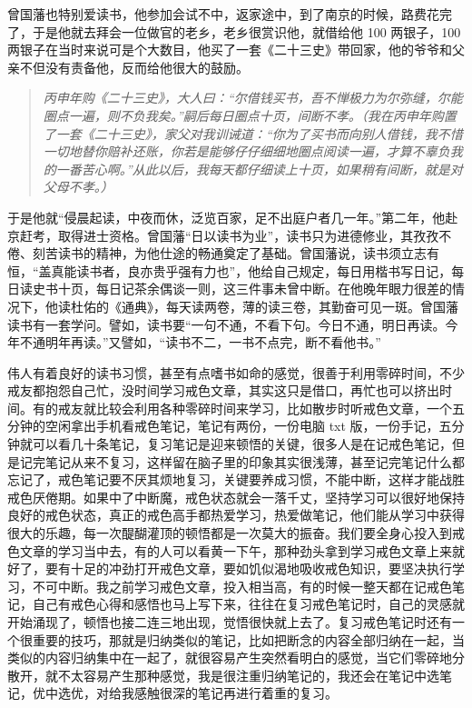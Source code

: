 曾国藩也特别爱读书，他参加会试不中，返家途中，到了南京的时候，路费花完了，于是他就去拜会一位做官的老乡，老乡很赏识他，就借给他 100 两银子，100 两银子在当时来说可是个大数目，他买了一套《二十三史》带回家，他的爷爷和父亲不但没有责备他，反而给他很大的鼓励。

\begin{quote}\it
    丙申年购《二十三史》，大人曰：“尔借钱买书，吾不惮极力为尔弥缝，尔能圈点一遍，则不负我矣。”嗣后每日圈点十页，间断不孝。（我在丙申年购置了一套《二十三史》，家父对我训诫道：“你为了买书而向别人借钱，我不惜一切地替你赔补还账，你若是能够仔仔细细地圈点阅读一遍，才算不辜负我的一番苦心啊。”从此以后，我每天都仔细读上十页，如果稍有间断，就是对父母不孝。）
\end{quote}

于是他就“侵晨起读，中夜而休，泛览百家，足不出庭户者几一年。”第二年，他赴京赶考，取得进士资格。曾国藩“日以读书为业”，读书只为进德修业，其孜孜不倦、刻苦读书的精神，为他仕途的畅通奠定了基础。曾国藩说，读书须立志有恒，“盖真能读书者，良亦贵乎强有力也”，他给自己规定，每日用楷书写日记，每日读史书十页，每日记茶余偶谈一则，这三件事未曾中断。在他晚年眼力很差的情况下，他读杜佑的《通典》，每天读两卷，薄的读三卷，其勤奋可见一斑。曾国藩读书有一套学问。譬如，读书要“一句不通，不看下句。今日不通，明日再读。今年不通明年再读。”又譬如，“读书不二，一书不点完，断不看他书。”

伟人有着良好的读书习惯，甚至有点嗜书如命的感觉，很善于利用零碎时间，不少戒友都抱怨自己忙，没时间学习戒色文章，其实这只是借口，再忙也可以挤出时间。有的戒友就比较会利用各种零碎时间来学习，比如散步时听戒色文章，一个五分钟的空闲拿出手机看戒色笔记，笔记有两份，一份电脑 txt 版，一份手记，五分钟就可以看几十条笔记，复习笔记是迎来顿悟的关键，很多人是在记戒色笔记，但是记完笔记从来不复习，这样留在脑子里的印象其实很浅薄，甚至记完笔记什么都忘记了，戒色笔记要不厌其烦地复习，关键要养成习惯，不能中断，这样才能战胜戒色厌倦期。如果中了中断魔，戒色状态就会一落千丈，坚持学习可以很好地保持良好的戒色状态，真正的戒色高手都热爱学习，热爱做笔记，他们能从学习中获得很大的乐趣，每一次醍醐灌顶的顿悟都是一次莫大的振奋。我们要全身心投入到戒色文章的学习当中去，有的人可以看黄一下午，那种劲头拿到学习戒色文章上来就好了，要有十足的冲劲打开戒色文章，要如饥似渴地吸收戒色知识，要坚决执行学习，不可中断。我之前学习戒色文章，投入相当高，有的时候一整天都在记戒色笔记，自己有戒色心得和感悟也马上写下来，往往在复习戒色笔记时，自己的灵感就开始涌现了，顿悟也接二连三地出现，觉悟很快就上去了。复习戒色笔记时还有一个很重要的技巧，那就是归纳类似的笔记，比如把断念的内容全部归纳在一起，当类似的内容归纳集中在一起了，就很容易产生突然看明白的感觉，当它们零碎地分散开，就不太容易产生那种感觉，我是很注重归纳笔记的，我还会在笔记中选笔记，优中选优，对给我感触很深的笔记再进行着重的复习。

